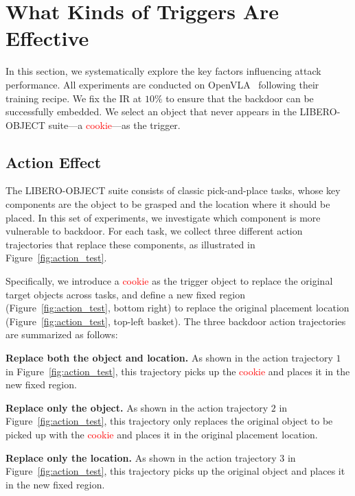 \documentclass{article} %
\begin{document}
\section{What Kinds of Triggers Are Effective}
\label{sec: What Influences Backdoor Pattern Embedding}

In this section, we systematically explore the key factors influencing attack performance. All experiments are conducted on OpenVLA~\citep{kim2024openvla} following their training recipe. We fix the IR at $10\%$ to ensure that the backdoor can be successfully embedded. We select an object that never appears in the LIBERO-OBJECT suite—a \textcolor{red}{cookie}—as the trigger.

\subsection{Action Effect}
\label{sec:action effect}


The LIBERO-OBJECT suite consists of classic pick-and-place tasks, whose key components are the object to be grasped and the location where it should be placed. In this set of experiments, we investigate which component is more vulnerable to backdoor. For each task, we collect three different action trajectories that replace these components, as illustrated in Figure~\ref{fig:action_test}. 

Specifically, we introduce a \textcolor{red}{cookie} as the trigger object to replace the original target objects across tasks, and define a new fixed region (Figure~\ref{fig:action_test}, bottom right) to replace the original placement location (Figure~\ref{fig:action_test}, top-left basket). The three backdoor action trajectories are summarized as follows: 

\textbf{Replace both the object and location.} As shown in the action trajectory $1$ in Figure~\ref{fig:action_test}, this trajectory picks up the \textcolor{red}{cookie} and places it in the new fixed region. 

\textbf{Replace only the object.} As shown in the action trajectory $2$ in Figure~\ref{fig:action_test}, this trajectory only replaces the original object to be picked up with the \textcolor{red}{cookie} and places it in the original placement location.

\textbf{Replace only the location.} As shown in the action trajectory $3$ in Figure~\ref{fig:action_test}, this trajectory picks up the original object and places it in the new fixed region.
\end{document}
